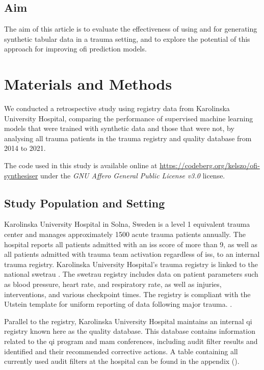 \documentclass[12pt, a4paper]{article}
\begin{document}
\subsection{Aim}
The aim of this article is to evaluate the effectiveness of using  and  for generating synthetic tabular data in a trauma setting, and to explore the potential of this approach for improving \acrshort{ofi} prediction models.

\section{Materials and Methods}
We conducted a retrospective study using registry data from Karolinska University Hospital, comparing the performance of supervised machine learning models that were trained with synthetic data and those that were not, by analysing all trauma patients in the trauma registry and quality database from 2014 to 2021.

The code used in this study is available online at \url{https://codeberg.org/kelszo/ofi-synthesiser} under the \textit{GNU Affero General Public License v3.0} license.

\subsection{Study Population and Setting}
Karolinska University Hospital in Solna, Sweden is a level 1 equivalent trauma center and manages approximately 1500 acute trauma patients annually. The hospital reports all patients admitted with an \acrfull{iss} score of more than 9, as well as all patients admitted with trauma team activation regardless of \acrshort{iss}, to an internal trauma registry. Karolinska University Hospital's trauma registry is linked to the national \acrfull{swetrau} \cite{swetrau}. The \acrshort{swetrau} registry includes data on patient parameters such as blood pressure, heart rate, and respiratory rate, as well as injuries, interventions, and various checkpoint times. The registry is compliant with the Utstein template for uniform reporting of data following major trauma. \cite{ringdal_utstein_2008}.

Parallel to the registry, Karolinska University Hospital maintains an internal \acrshort{qi} registry known here as the quality database.  This database contains information related to the \acrshort{qi} program and \acrshort{mam} conferences, including audit filter results and identified  and their recommended corrective actions. A table containing all currently used audit filters at the hospital can be found in the appendix ().
\end{document}
